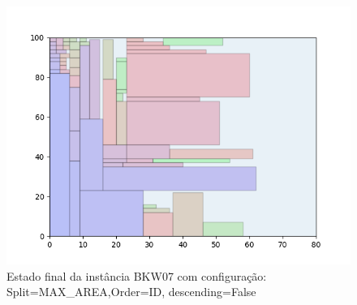 \begin{figure}[H]
    \centering
    \caption[]{Estado final da instância BKW07 com configuração: Split=MAX_AREA,Order=ID, descending=False}
    \label{fig:bkw07-max_area-id-false}
    \includegraphics[scale=0.5]{output/figures/bkw/bkw07/max_area/id/false/00}
\end{figure}
